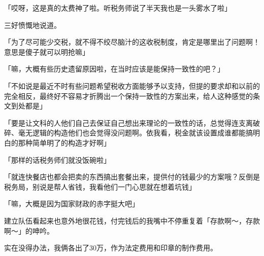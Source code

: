 「哎呀，这是真的太费神了啦。听税务师说了半天我也是一头雾水了啦」

三好愤慨地说道。

「为了尽可能少交税，就不得不绞尽脑汁的这收税制度，肯定是哪里出了问题啊！意思是傻子就可以明抢嘛」

「嘛，大概有些历史遗留原因啦，在当时应该是能保持一致性的吧？」

「不如说是最近不时有些问题希望税收方面能够予以支持，但提的要求却和以前的完全相反，最终好不容易才折腾出一个保持一致性的方案出来，给人这种感觉的条文到处都是」

「要是让文科的人他们自己去保证自己想出来理论的一致性的话，总觉得连支离破碎、毫无逻辑的构造他们也会觉得没问题啊。依我看，税金就该设置成谁都能搞明白的那种简单明了的构造才好啊」

「那样的话税务师们就没饭碗啦」

「就连快餐店也都会把卖的东西搞出套餐出来，提供付的钱最少的方案哦？反倒是税务局，别说是帮人省钱，我看他们一门心思就在想着坑钱」

「嘛，大概是因为国家财政的赤字挺大吧」

建立队伍看起来也意外地很花钱，付完钱后的我嘴中不停重复着「存款啊～，存款啊～」的呻吟。

实在没得办法，我俩各出了30万，作为法定费用和印章的制作费用。

